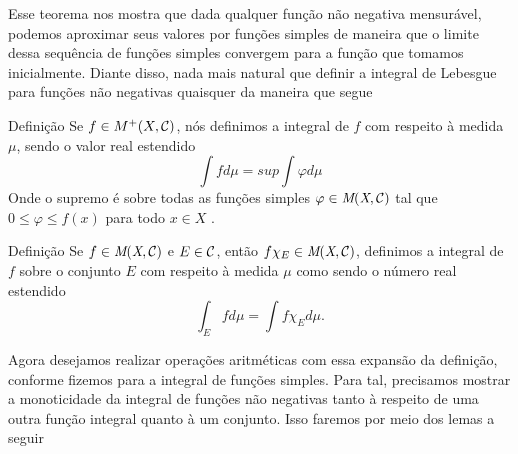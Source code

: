 Esse teorema nos mostra que dada qualquer função não negativa mensurável, podemos aproximar seus valores por funções simples de maneira que o limite dessa sequência de funções simples convergem para a função que tomamos inicialmente.
Diante disso, nada mais natural que definir a integral de Lebesgue para funções não negativas quaisquer da maneira que segue
\begin{env}{Definição}
	\label{def:integral de uma função qualquer não negativa}
	Se $f \in M^+(X,\operatorname{\mathcal{C}})$, nós definimos a integral de $f$ com respeito à medida $\mu$, sendo o valor real estendido
	$$
	\int f d\mu = sup \int \varphi d\mu
	$$
	Onde o supremo é sobre todas as funções simples $\varphi \in \operatorname{\textit{M}(\textit{X}, \mathcal{C} )}$ tal que  $0 \leq \varphi \leq f(x)$ para todo $x \in X$
	\cite{bartle}. 
\end{env}
\begin{env}{Definição}
	\label{def: integral de uma função não neg com respeito a um conjunto específico}
	Se $f \in \operatorname{\textit{M}(\textit{X}, \mathcal{C} )}$ e $E \in \operatorname{\mathcal{C}}$, então $f\chi_{E} \in \operatorname{\textit{M}(\textit{X}, \mathcal{C} )}$, definimos a integral de $f$ sobre o conjunto $E$ com respeito à medida $\mu$ como sendo o número real estendido
	$$
	\displaystyle \int_E f d\mu = \int f\chi_E d\mu.
	$$
\end{env}

Agora desejamos realizar operações aritméticas com essa expansão da definição, conforme fizemos para a integral de funções simples.
Para tal, precisamos mostrar a monoticidade da integral de funções não negativas tanto à respeito de uma outra função integral quanto à um conjunto.
Isso faremos por meio dos lemas a seguir

